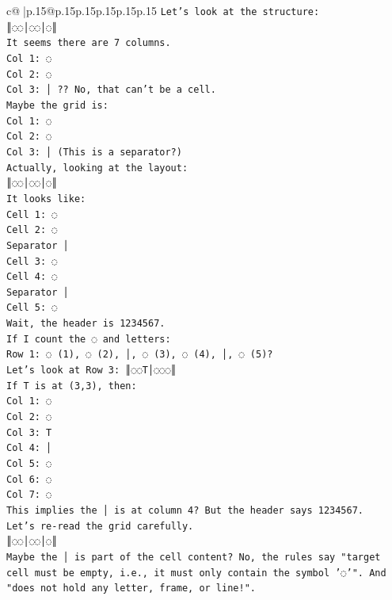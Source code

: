 \documentclass{article}
\begin{document}
{\begin{supertabular}{c@{$\;$}|p{.15\linewidth}@{}p{.15\linewidth}p{.15\linewidth}p{.15\linewidth}p{.15\linewidth}p{.15\linewidth}}
{{{\texttt{Let's look at the structure:} \\
\texttt{║◌◌│◌◌│◌║} \\
\texttt{It seems there are 7 columns.} \\
\texttt{Col 1: ◌} \\
\texttt{Col 2: ◌} \\
\texttt{Col 3: │ ?? No, that can't be a cell.} \\
\texttt{Maybe the grid is:} \\
\texttt{Col 1: ◌} \\
\texttt{Col 2: ◌} \\
\texttt{Col 3: │ (This is a separator?)} \\
\texttt{Actually, looking at the layout:} \\
\texttt{║◌◌│◌◌│◌║} \\
\texttt{It looks like:} \\
\texttt{Cell 1: ◌} \\
\texttt{Cell 2: ◌} \\
\texttt{Separator │} \\
\texttt{Cell 3: ◌} \\
\texttt{Cell 4: ◌} \\
\texttt{Separator │} \\
\texttt{Cell 5: ◌} \\
\texttt{Wait, the header is 1234567.} \\
\texttt{If I count the ◌ and letters:} \\
\texttt{Row 1: ◌ (1), ◌ (2), │, ◌ (3), ◌ (4), │, ◌ (5)?} \\
\texttt{Let's look at Row 3: ║◌◌T│◌◌◌║} \\
\texttt{If T is at (3,3), then:} \\
\texttt{Col 1: ◌} \\
\texttt{Col 2: ◌} \\
\texttt{Col 3: T} \\
\texttt{Col 4: │} \\
\texttt{Col 5: ◌} \\
\texttt{Col 6: ◌} \\
\texttt{Col 7: ◌} \\
\texttt{This implies the │ is at column 4? But the header says 1234567.} \\
\texttt{Let's re{-}read the grid carefully.} \\
\texttt{║◌◌│◌◌│◌║} \\
\texttt{Maybe the │ is part of the cell content? No, the rules say "target cell must be empty, i.e., it must only contain the symbol '◌'". And "does not hold any letter, frame, or line!".} \\
}}}
\end{supertabular}}
\end{document}
